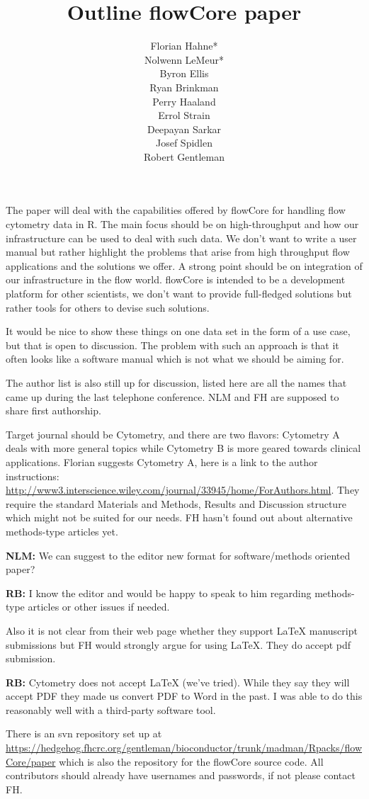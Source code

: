 \documentclass[12pt]{article}
\title{Outline flowCore paper}
\author{Florian Hahne*\\
  Nolwenn LeMeur*\\
  Byron Ellis\\
  Ryan Brinkman\\
  Perry Haaland\\
  Errol Strain\\
  Deepayan Sarkar\\
  Josef Spidlen\\
  Robert Gentleman
 }
\begin{document}
\vspace{2ex} 

The paper will deal with the capabilities offered by flowCore for
handling flow cytometry data in R. The main focus should be on
high-throughput and how our infrastructure can be used to deal with
such data. We don't want to write a user manual but rather highlight
the problems that arise from high throughput flow applications and the
solutions we offer. A strong point should be on integration of our
infrastructure in the flow world. flowCore is intended to be a
development platform for other scientists, we don't want to provide
full-fledged solutions but rather tools for others to devise such
solutions.

It would be nice to show these things on one data set in the form of a
use case, but that is open to discussion. The problem with such an
approach is that it often looks like a software manual which is not
what we should be aiming for. 

\bigskip
The author list is also still up for discussion, listed here are all
the names that came up during the last telephone conference. NLM and
FH are supposed to share first authorship.

\bigskip
Target journal should be Cytometry, and there are two flavors:
Cytometry A deals with more general topics while Cytometry B is more
geared towards clinical applications. Florian suggests Cytometry A,
here is a link to the author instructions:
\url{http://www3.interscience.wiley.com/journal/33945/home/ForAuthors.html}.
They require the standard Materials and Methods, Results and
Discussion structure which might not be suited for our needs. FH
hasn't found out about alternative methods-type articles yet.  

{\bf NLM:} We can suggest to the editor new format for software/methods
oriented paper?

{\bf RB:} I know the editor and would be happy to speak to him
regarding methods-type articles or other issues if needed.

Also it is not clear from their web page whether they support LaTeX
manuscript submissions but FH would strongly argue for using
LaTeX. They do accept pdf submission.

{\bf RB:} Cytometry does not accept LaTeX (we've tried). While they say
they will accept PDF they made us convert PDF to Word in the past. I
was able to do this reasonably well with a third-party software tool.

\bigskip
There is an svn repository set up at
\url{https://hedgehog.fhcrc.org/gentleman/bioconductor/trunk/madman/Rpacks/flowCore/paper}
which is also the repository for the flowCore source code. All
contributors should already have usernames and passwords, if not
please contact FH.
\end{document}
